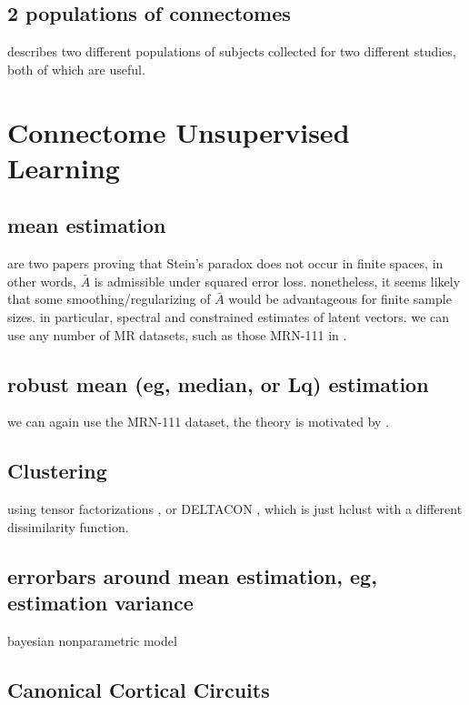 \documentclass[final,leqno]{article}
\begin{document}
\subsection{2 populations of connectomes}

\cite{Nooner2012,Landman2010} describes two different populations of subjects collected for two different studies, both of which are useful.

\section{Connectome Unsupervised Learning}

\subsection{mean estimation}

\cite{Johnson71a,Gutmann82a} are two papers proving that Stein's paradox does not occur in finite spaces, in other words, $\bar{A}$ is admissible under squared error loss.  nonetheless, it seems likely that some smoothing/regularizing of $\bar{A}$ would be advantageous for finite sample sizes.  in particular, spectral and constrained estimates of latent vectors.  we can use any number of MR datasets, such as those MRN-111 in \cite{MIGRAINE}.


\subsection{robust mean (eg, median, or Lq) estimation}

we can again use the MRN-111 dataset, the theory is motivated by \cite{Ferrari2010a,Qin2013a}.


\subsection{Clustering}

using tensor factorizations \cite{Lee13a,Lee14a,Lee14b}, or DELTACON \cite{Koutra2013,Koutra2014}, which is just hclust with a different dissimilarity function.

\subsection{errorbars around mean estimation, eg, estimation variance}
 
bayesian nonparametric model \cite{Durante14a}


\subsection{Canonical Cortical Circuits}
\end{document}
